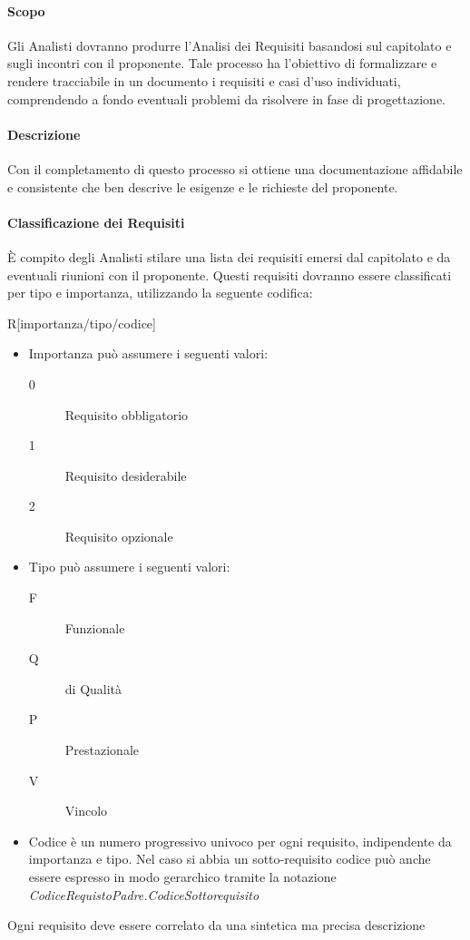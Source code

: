 \documentclass[12pt,a4paper]{article}
\begin{document}
\paragraph{Scopo}
Gli Analisti dovranno produrre l’Analisi dei Requisiti basandosi sul capitolato e sugli incontri con il proponente. Tale processo ha l’obiettivo di formalizzare e rendere tracciabile in un documento i requisiti e casi d’uso individuati, comprendendo a fondo eventuali problemi da risolvere in fase di progettazione.

\paragraph{Descrizione}
Con il completamento di questo processo si ottiene una documentazione affidabile e consistente che ben descrive le esigenze e le richieste del proponente.

\paragraph{Classificazione dei Requisiti}
È compito degli Analisti stilare una lista dei requisiti emersi dal capitolato e da eventuali
riunioni con il proponente. Questi requisiti dovranno essere classificati per tipo e
importanza, utilizzando la seguente codifica:
\begin{center}
R[importanza/tipo/codice]
\end{center}
\begin{itemize}
\item Importanza può assumere i seguenti valori:
\begin{description}
\item[0] Requisito obbligatorio
\item[1] Requisito desiderabile
\item[2] Requisito opzionale
\end{description}
\end{itemize}
\begin{itemize}
\item Tipo può assumere i seguenti valori:
\begin{description}
\item[F] Funzionale
\item[Q] di Qualità
\item[P] Prestazionale
\item[V] Vincolo
\end{description}
\end{itemize}
\begin{itemize}
\item Codice è un numero progressivo univoco per ogni requisito, indipendente da importanza e tipo. Nel caso si abbia un sotto-requisito codice può anche essere espresso in modo gerarchico tramite la notazione \textit{CodiceRequistoPadre.CodiceSottorequisito}
\end{itemize}
Ogni requisito deve essere correlato da una sintetica ma precisa descrizione
\end{document}
